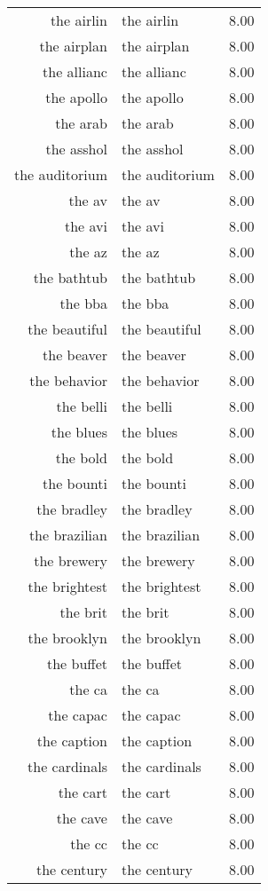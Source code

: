 \begin{table}[ht]
\begin{tabular}{rlr}
  the airlin & the airlin & 8.00 \\ 
  the airplan & the airplan & 8.00 \\ 
  the allianc & the allianc & 8.00 \\ 
  the apollo & the apollo & 8.00 \\ 
  the arab & the arab & 8.00 \\ 
  the asshol & the asshol & 8.00 \\ 
  the auditorium & the auditorium & 8.00 \\ 
  the av & the av & 8.00 \\ 
  the avi & the avi & 8.00 \\ 
  the az & the az & 8.00 \\ 
  the bathtub & the bathtub & 8.00 \\ 
  the bba & the bba & 8.00 \\ 
  the beautiful & the beautiful & 8.00 \\ 
  the beaver & the beaver & 8.00 \\ 
  the behavior & the behavior & 8.00 \\ 
  the belli & the belli & 8.00 \\ 
  the blues & the blues & 8.00 \\ 
  the bold & the bold & 8.00 \\ 
  the bounti & the bounti & 8.00 \\ 
  the bradley & the bradley & 8.00 \\ 
  the brazilian & the brazilian & 8.00 \\ 
  the brewery & the brewery & 8.00 \\ 
  the brightest & the brightest & 8.00 \\ 
  the brit & the brit & 8.00 \\ 
  the brooklyn & the brooklyn & 8.00 \\ 
  the buffet & the buffet & 8.00 \\ 
  the ca & the ca & 8.00 \\ 
  the capac & the capac & 8.00 \\ 
  the caption & the caption & 8.00 \\ 
  the cardinals & the cardinals & 8.00 \\ 
  the cart & the cart & 8.00 \\ 
  the cave & the cave & 8.00 \\ 
  the cc & the cc & 8.00 \\ 
  the century & the century & 8.00 \\ 

\end{tabular}
\end{table}
